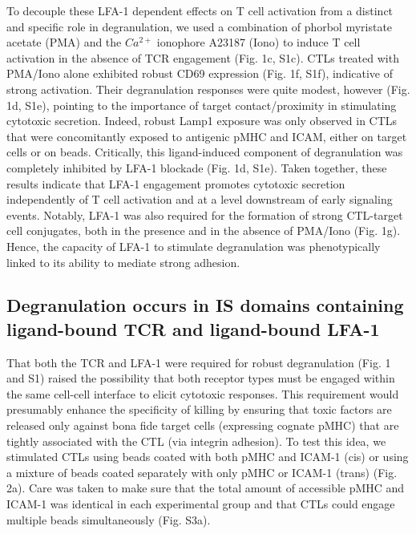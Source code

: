 To decouple these LFA-1 dependent effects on T cell activation from a distinct and specific role in degranulation, we used a combination of phorbol myristate acetate (PMA) and the $Ca^{2+}$ ionophore A23187 (Iono) to induce T cell activation in the absence of TCR engagement (Fig. 1c, S1c). CTLs treated with PMA/Iono alone exhibited robust CD69 expression (Fig. 1f, S1f), indicative of strong activation. Their degranulation responses were quite modest, however (Fig. 1d, S1e), pointing to the importance of target contact/proximity in stimulating cytotoxic secretion. Indeed, robust Lamp1 exposure was only observed in CTLs that were concomitantly exposed to antigenic pMHC and ICAM, either on target cells or on beads. Critically, this ligand-induced component of degranulation was completely inhibited by LFA-1 blockade (Fig. 1d, S1e). Taken together, these results indicate that LFA-1 engagement promotes cytotoxic secretion independently of T cell activation and at a level downstream of early signaling events. Notably, LFA-1 was also required for the formation of strong CTL-target cell conjugates, both in the presence and in the absence of PMA/Iono (Fig. 1g). Hence, the capacity of LFA-1 to stimulate degranulation was phenotypically linked to its ability to mediate strong adhesion. 

\subsection{Degranulation occurs in IS domains containing ligand-bound TCR and ligand-bound LFA-1}
That both the TCR and LFA-1 were required for robust degranulation (Fig. 1 and S1) raised the possibility that both receptor types must be engaged within the same cell-cell interface to elicit cytotoxic responses. This requirement would presumably enhance the specificity of killing by ensuring that toxic factors are released only against bona fide target cells (expressing cognate pMHC) that are tightly associated with the CTL (via integrin adhesion). To test this idea, we stimulated CTLs using beads coated with both pMHC and ICAM-1 (cis) or using a mixture of beads coated separately with only pMHC or ICAM-1 (trans) (Fig. 2a). Care was taken to make sure that the total amount of accessible pMHC and ICAM-1 was identical in each experimental group and that CTLs could engage multiple beads simultaneously (Fig. S3a). 

